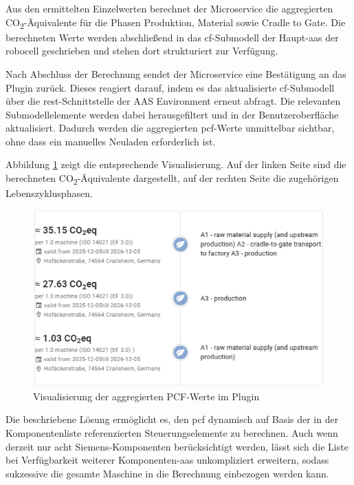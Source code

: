 Aus den ermittelten Einzelwerten berechnet der Microservice die aggregierten CO\textsubscript{2}-Äquivalente für die Phasen Produktion, Material sowie Cradle to Gate. 
Die berechneten Werte werden abschließend in das \acs{cf}-Submodell der Haupt-\acs{aas} der robocell geschrieben und stehen dort strukturiert zur Verfügung.

Nach Abschluss der Berechnung sendet der Microservice eine Bestätigung an das Plugin zurück. 
Dieses reagiert darauf, indem es das aktualisierte \acs{cf}-Submodell über die \acs{rest}-Schnittstelle der AAS Environment erneut abfragt. 
Die relevanten Submodellelemente werden dabei herausgefiltert und in der Benutzeroberfläche aktualisiert. 
Dadurch werden die aggregierten \acs{pcf}-Werte unmittelbar sichtbar, ohne dass ein manuelles Neuladen erforderlich ist.

Abbildung \ref{fig:PluginAggregation} zeigt die entsprechende Visualisierung. 
Auf der linken Seite sind die berechneten CO\textsubscript{2}-Äquivalente dargestellt, auf der rechten Seite die zugehörigen Lebenszyklusphasen.

\begin{figure}[htbp]
    \centering
        \includegraphics{Bilder/Ergebnisse/DPP/PluginAggregation.png}
    \caption{Visualisierung der aggregierten PCF-Werte im Plugin}
    \label{fig:PluginAggregation}
\end{figure}

Die beschriebene Lösung ermöglicht es, den \acs{pcf} dynamisch auf Basis der in der Komponentenliste referenzierten Steuerungselemente zu berechnen. 
Auch wenn derzeit nur acht Siemens-Komponenten berücksichtigt werden, lässt sich die Liste bei Verfügbarkeit weiterer Komponenten-\acs{aas} unkompliziert erweitern, sodass sukzessive die gesamte Maschine in die Berechnung einbezogen werden kann.

